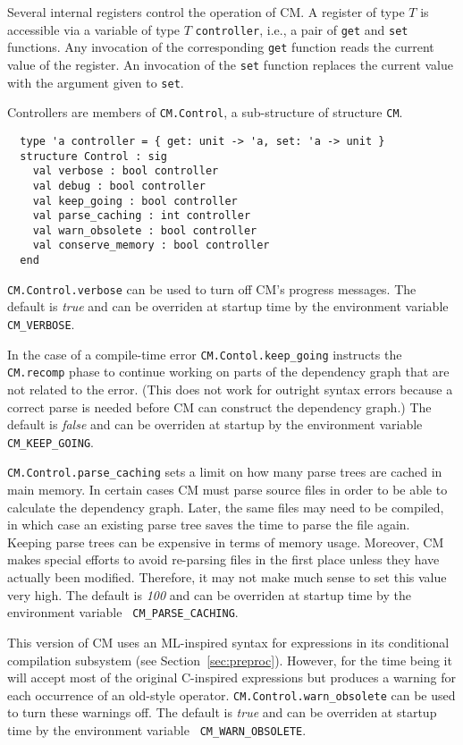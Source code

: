\documentclass{article}
\begin{document}
Several internal registers control the operation of CM.  A register of
type $T$ is accessible via a variable of type $T$ {\tt controller},
i.e., a pair of {\tt get} and {\tt set} functions.  Any invocation of
the corresponding {\tt get} function reads the current value of the
register.  An invocation of the {\tt set} function replaces the
current value with the argument given to {\tt set}.

Controllers are members of {\tt CM.Control}, a sub-structure of
structure {\tt CM}.

\begin{verbatim}
  type 'a controller = { get: unit -> 'a, set: 'a -> unit }
  structure Control : sig
    val verbose : bool controller
    val debug : bool controller
    val keep_going : bool controller
    val parse_caching : int controller
    val warn_obsolete : bool controller
    val conserve_memory : bool controller
  end
\end{verbatim}

{\tt CM.Control.verbose} can be used to turn off CM's progress
messages.  The default is {\em true} and can be overriden at startup
time by the environment variable {\tt CM\_VERBOSE}.

In the case of a compile-time error {\tt CM.Contol.keep\_going}
instructs the {\tt CM.recomp} phase to continue working on parts of
the dependency graph that are not related to the error.  (This does
not work for outright syntax errors because a correct parse is needed
before CM can construct the dependency graph.)  The default is {\em
false} and can be overriden at startup by the environment variable
{\tt CM\_KEEP\_GOING}.

{\tt CM.Control.parse\_caching} sets a limit on how many parse trees
are cached in main memory.  In certain cases CM must parse source
files in order to be able to calculate the dependency graph.  Later,
the same files may need to be compiled, in which case an existing
parse tree saves the time to parse the file again.  Keeping parse
trees can be expensive in terms of memory usage.  Moreover, CM makes
special efforts to avoid re-parsing files in the first place unless
they have actually been modified.  Therefore, it may not make much
sense to set this value very high.  The default is {\em 100} and can
be overriden at startup time by the environment variable {\tt
CM\_PARSE\_CACHING}.

This version of CM uses an ML-inspired syntax for expressions in its
conditional compilation subsystem (see Section~\ref{sec:preproc}).
However, for the time being it will accept most of the original
C-inspired expressions but produces a warning for each occurrence of
an old-style operator. {\tt CM.Control.warn\_obsolete} can be used to
turn these warnings off. The default is {\em true} and can be
overriden at startup time by the environment variable {\tt
CM\_WARN\_OBSOLETE}.
\end{document}
